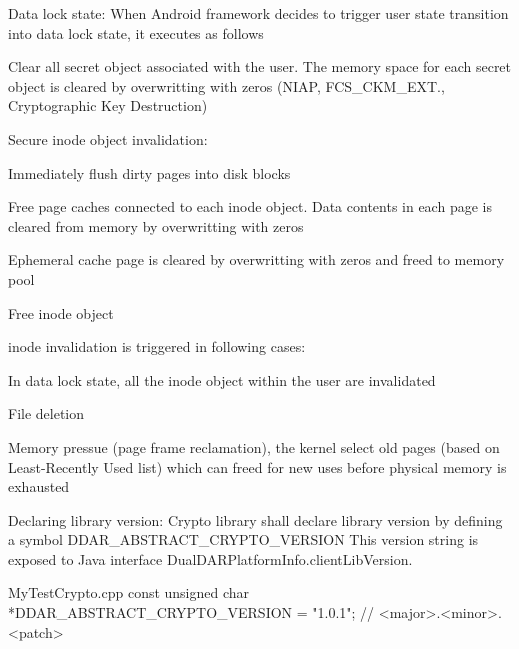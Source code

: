 \-Data lock state\-: \-When \-Android framework decides to trigger user state transition into data lock state, it executes as follows
\begin{DoxyItemize}
\item \-Clear all secret object associated with the user. \-The memory space for each secret object is cleared by overwritting with zeros (\-N\-I\-A\-P, \-F\-C\-S\-\_\-\-C\-K\-M\-\_\-\-E\-X\-T., \-Cryptographic \-Key \-Destruction)
\item \-Secure inode object invalidation\-:
\begin{DoxyItemize}
\item \-Immediately flush dirty pages into disk blocks
\item \-Free page caches connected to each inode object. \-Data contents in each page is cleared from memory by overwritting with zeros
\item \-Ephemeral cache page is cleared by overwritting with zeros and freed to memory pool
\item \-Free inode object
\end{DoxyItemize}
\item inode invalidation is triggered in following cases\-:
\begin{DoxyItemize}
\item \-In data lock state, all the inode object within the user are invalidated
\item \-File deletion
\item \-Memory pressue (page frame reclamation), the kernel select old pages (based on \-Least-\/\-Recently \-Used list) which can freed for new uses before physical memory is exhausted
\end{DoxyItemize}
\end{DoxyItemize}

\-Declaring library version\-: \-Crypto library shall declare library version by defining a symbol \-D\-D\-A\-R\-\_\-\-A\-B\-S\-T\-R\-A\-C\-T\-\_\-\-C\-R\-Y\-P\-T\-O\-\_\-\-V\-E\-R\-S\-I\-O\-N \-This version string is exposed to \-Java interface \-Dual\-D\-A\-R\-Platform\-Info.\-client\-Lib\-Version.


\begin{DoxyPre}
 MyTestCrypto.cpp
 const unsigned char *DDAR\_ABSTRACT\_CRYPTO\_VERSION = "1.0.1";  // <major>.<minor>.<patch>
 \end{DoxyPre}
 

